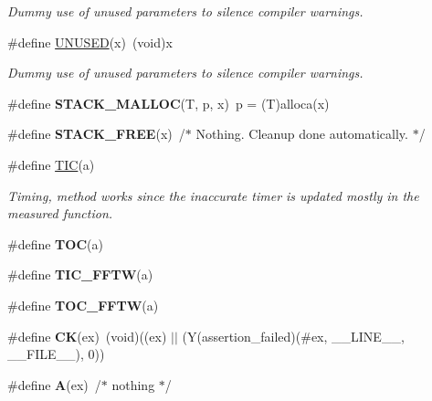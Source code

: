 \begin{DoxyCompactItemize}
\begin{DoxyCompactList}\small\item\em Dummy use of unused parameters to silence compiler warnings. \end{DoxyCompactList}\item 
\hypertarget{group__nfftutil_ga86d500a34c624c2cae56bc25a31b12f3}{\#define \hyperlink{group__nfftutil_ga86d500a34c624c2cae56bc25a31b12f3}{U\-N\-U\-S\-E\-D}(x)~(void)x}\label{group__nfftutil_ga86d500a34c624c2cae56bc25a31b12f3}

\begin{DoxyCompactList}\small\item\em Dummy use of unused parameters to silence compiler warnings. \end{DoxyCompactList}\item 
\hypertarget{group__nfftutil_ga0da4ed0cfb39cbfe4114d125bceaccda}{\#define {\bfseries S\-T\-A\-C\-K\-\_\-\-M\-A\-L\-L\-O\-C}(T, p, x)~p = (T)alloca(x)}\label{group__nfftutil_ga0da4ed0cfb39cbfe4114d125bceaccda}

\item 
\hypertarget{group__nfftutil_ga563f7a6f461e6733fb2b6c2dd1af9d2c}{\#define {\bfseries S\-T\-A\-C\-K\-\_\-\-F\-R\-E\-E}(x)~/$\ast$ Nothing. Cleanup done automatically. $\ast$/}\label{group__nfftutil_ga563f7a6f461e6733fb2b6c2dd1af9d2c}

\item 
\#define \hyperlink{group__nfftutil_ga05909fc22b7177d1bd50119f40fbb1ec}{T\-I\-C}(a)
\begin{DoxyCompactList}\small\item\em Timing, method works since the inaccurate timer is updated mostly in the measured function. \end{DoxyCompactList}\item 
\hypertarget{group__nfftutil_gae1adb0a4004b84a277c80676c8bb6efb}{\#define {\bfseries T\-O\-C}(a)}\label{group__nfftutil_gae1adb0a4004b84a277c80676c8bb6efb}

\item 
\hypertarget{group__nfftutil_ga165d2a2300a7c50957661f7df0e14ec9}{\#define {\bfseries T\-I\-C\-\_\-\-F\-F\-T\-W}(a)}\label{group__nfftutil_ga165d2a2300a7c50957661f7df0e14ec9}

\item 
\hypertarget{group__nfftutil_gaa223d5c614418ff5e5f47211b1ef2e22}{\#define {\bfseries T\-O\-C\-\_\-\-F\-F\-T\-W}(a)}\label{group__nfftutil_gaa223d5c614418ff5e5f47211b1ef2e22}

\item 
\hypertarget{group__nfftutil_ga1be2a738a4a490e5ea5c8e4159e39f5e}{\#define {\bfseries C\-K}(ex)~(void)((ex) $\vert$$\vert$ (Y(assertion\-\_\-failed)(\#ex, \-\_\-\-\_\-\-L\-I\-N\-E\-\_\-\-\_\-, \-\_\-\-\_\-\-F\-I\-L\-E\-\_\-\-\_\-), 0))}\label{group__nfftutil_ga1be2a738a4a490e5ea5c8e4159e39f5e}

\item 
\hypertarget{group__nfftutil_ga7aad3b42bc1a0788d427a911d1dca138}{\#define {\bfseries A}(ex)~/$\ast$ nothing $\ast$/}\label{group__nfftutil_ga7aad3b42bc1a0788d427a911d1dca138}

\end{DoxyCompactItemize}
